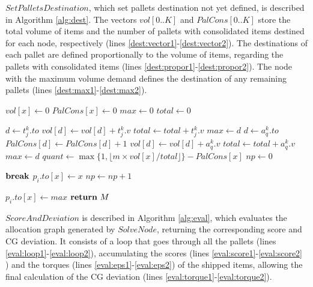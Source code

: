 \documentclass[preprint,authoryear]{elsarticle}
\begin{document}
$SetPalletsDestination$, which set pallets destination not yet defined, is described in Algorithm \ref{alg:dest}. The vectors $vol[0..K]$\/ and $PalCons[0..K]$\/ store the total volume of items and the number of pallets with consolidated items destined for each node, respectively (lines \ref{dest:vector1}-\ref{dest:vector2}). The destinations of each pallet are defined proportionally to the volume of items, regarding the pallets with consolidated items (lines \ref{dest:propor1}-\ref{dest:propor2}). The node with the maximum volume demand defines the destination of any remaining pallets (lines \ref{dest:max1}-\ref{dest:max2}).


\begin{algorithm}[H]
	\caption{$SetPalletsDestination(k)$}  \label{alg:dest}
	\begin{algorithmic}[1]
		
		 \label{dest:vector1}
			\State $vol[x] \gets 0$ 
			\State $PalCons[x]  \gets 0$
		\EndFor
		\State $max \gets 0$ \label{dest:max}
		\State $total \gets 0$ 

			\State $d \gets t_j^k.to$
				\State $vol[d] \gets vol[d] + t_j^k.v$ 
				\State $total \gets total + t_j^k.v$ 
					\State $max \gets d$ 
				\EndIf
			\EndIf
		\EndFor
			\State $d \gets a_q^k.to$
			\State $PalCons[d] \gets PalCons[d]+1$
				\State $vol[d] \gets vol[d] + a_q^k.v$
				\State $total \gets total + a_q^k.v$ 
					\State $max \gets d$ 
				\EndIf
			\EndIf
		\EndFor \label{dest:vector2}
		 \label{dest:propor1}
				\State $quant \gets \max \{1, \lfloor{ m \times vol[x]/total}\rfloor \}-PalCons[x]$ 
				\State $np \gets 0$
				
						\State ${\bf break}$
					\EndIf
						\State $p_i.to[x] \gets x$
						\State $np \gets np + 1$
					\EndIf
				\EndFor
				
			\EndIf 
		\EndFor \label{dest:propor2}
		 \label{dest:max1}
				\State $p_i.to[x] \gets max$
			\EndIf
		\EndFor \label{dest:max2}
		\State ${\bf return}\ M$ 
		
	\end{algorithmic}
\end{algorithm}


$ScoreAndDeviation$\/ is described in Algorithm \ref{alg:eval}, which evaluates the allocation graph generated by $SolveNode$, returning the corresponding score and CG deviation. It consists of a loop that goes through all the pallets (lines \ref{eval:loop1}-\ref{eval:loop2}), accumulating the scores (lines \ref{eval:score1}-\ref{eval:score2} ) and the torques (lines \ref{eval:eps1}-\ref{eval:eps2}) of the shipped items, allowing the final calculation of the CG deviation (lines \ref{eval:torque1}-\ref{eval:torque2}).
\end{document}

